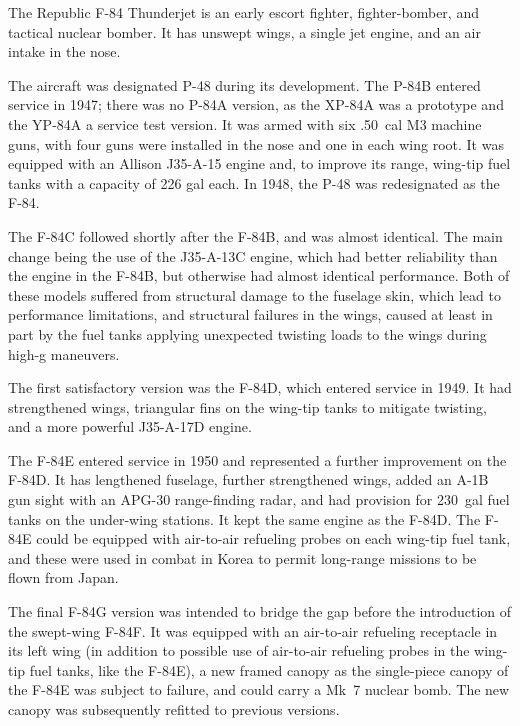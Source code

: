 
The Republic F-84 Thunderjet is an early escort fighter, fighter-bomber, and tactical nuclear bomber. It has unswept wings, a single jet engine, and an air intake in the nose. 

The aircraft was designated P-48 during its development. The P-84B entered service in 1947; there was no P-84A version, as the XP-84A was a prototype and the YP-84A a service test version. It was armed with six .50~cal M3 machine guns, with four guns were installed in the nose and one in each wing root. It was equipped with an Allison J35-A-15 engine and, to improve its range, wing-tip fuel tanks with a capacity of 226 gal each. In 1948, the P-48 was redesignated as the F-84.

The F-84C followed shortly after the F-84B, and was almost identical. The main change being the use of the J35-A-13C engine, which had better reliability than the engine in the F-84B, but otherwise had almost identical performance. Both of these models suffered from structural damage to the fuselage skin, which lead to performance limitations, and structural failures in the wings, caused at least in part by the fuel tanks applying unexpected twisting loads to the wings during high-g maneuvers.

The first satisfactory version was the F-84D, which entered service in 1949. It had strengthened wings, triangular fins on the wing-tip tanks to mitigate twisting, and a more powerful J35-A-17D engine.

The F-84E entered service in 1950 and represented a further improvement on the F-84D. It has lengthened fuselage, further strengthened wings, added an A-1B gun sight with an APG-30 range-finding radar, and had provision for 230~gal fuel tanks on the under-wing stations. It kept the same engine as the F-84D. The F-84E could be equipped with air-to-air refueling probes on each wing-tip fuel tank, and these were used in combat in Korea to permit long-range missions to be flown from Japan.

The final F-84G version was intended to bridge the gap before the introduction of the swept-wing F-84F. It was equipped with an air-to-air refueling receptacle in its left wing (in addition to possible use of air-to-air refueling probes in the wing-tip fuel tanks, like the F-84E), a new framed canopy as the single-piece canopy of the F-84E was subject to failure, and could carry a Mk~7 nuclear bomb. The new canopy was subsequently refitted to previous versions.

